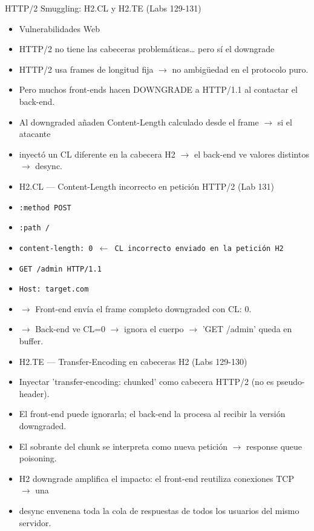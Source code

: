 \documentclass[aspectratio=169,10pt]{beamer}
\newcommand{\cmd}[1]{\texttt{\color{uznavy}#1}}
\begin{document}
\begin{frame}[allowframebreaks]{HTTP/2 Smuggling: H2.CL y H2.TE (Labs 129-131)}
\small
  \begin{itemize}
  \item Vulnerabilidades Web
  \item HTTP/2 no tiene las cabeceras problemáticas\dots{} pero sí el downgrade
  \item HTTP/2 usa frames de longitud fija $\rightarrow$ no ambigüedad en el protocolo puro.
  \item Pero muchos front-ends hacen DOWNGRADE a HTTP/1.1 al contactar el back-end.
  \item Al downgraded añaden Content-Length calculado desde el frame $\rightarrow$ si el atacante
  \item inyectó un CL diferente en la cabecera H2 $\rightarrow$ el back-end ve valores distintos $\rightarrow$ desync.
  \item H2.CL --- Content-Length incorrecto en petición HTTP/2 (Lab 131)
  \item \cmd{:method POST}
  \item \cmd{:path /}
  \item \cmd{content-length: 0 $\leftarrow$ CL incorrecto enviado en la petición H2}
  \item \cmd{GET /admin HTTP/1.1}
  \item \cmd{Host: target.com}
  \item $\rightarrow$ Front-end envía el frame completo downgraded con CL: 0.
  \item $\rightarrow$ Back-end ve CL=0 $\rightarrow$ ignora el cuerpo $\rightarrow$ 'GET /admin' queda en buffer.
  \item H2.TE --- Transfer-Encoding en cabeceras H2 (Labs 129-130)
  \item Inyectar 'transfer-encoding: chunked' como cabecera HTTP/2 (no es pseudo-header).
  \item El front-end puede ignorarla; el back-end la procesa al recibir la versión downgraded.
  \item El sobrante del chunk se interpreta como nueva petición $\rightarrow$ response queue poisoning.
  \item H2 downgrade amplifica el impacto: el front-end reutiliza conexiones TCP $\rightarrow$ una
  \item desync envenena toda la cola de respuestas de todos los usuarios del mismo servidor.
  \end{itemize}
\end{frame}
\end{document}
